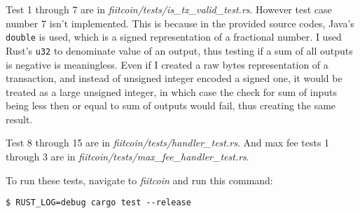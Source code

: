 Test 1 through 7 are in
\emph{fiitcoin/tests/is\_tx\_valid\_test.rs}. However test case number 7 isn't
implemented. This is because in the provided source codes, Java's \texttt{double}
is used, which is a signed representation of a fractional number\cite{oracleDOUBLEPRECISION}.
I used Rust's \texttt{u32}\cite{rustlangu32} to denominate value of an output,
thus testing if a sum of all outputs is negative is meaningless. Even if I created
a raw bytes representation of a transaction, and instead of unsigned integer
encoded a signed one, it would be treated as a large unsigned integer, in which
case the check for sum of inputs being less then or equal to sum of outputs would
fail, thus creating the same result.

Test 8 through 15 are in \emph{fiitcoin/tests/handler\_test.rs}. And max fee
tests 1 through 3 are in \emph{fiitcoin/tests/max\_fee\_handler\_test.rs}.

To run these tests, navigate to \emph{fiitcoin} and run this command:

\begin{verbatim}
$ RUST_LOG=debug cargo test --release
\end{verbatim}
